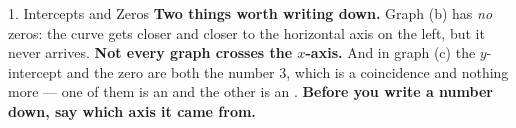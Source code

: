\documentclass[10pt]{article}
\begin{document}
\begin{notesbox}{1. Intercepts and Zeros}
\vspace{6pt}
\textbf{Two things worth writing down.} Graph (b) has \emph{no} zeros: the curve gets closer and
closer to the horizontal axis on the left, but it never arrives. \textbf{Not every graph crosses the
$x$-axis.} And in graph (c) the $y$-intercept and the zero are both the number $3$, which is a
coincidence and nothing more --- one of them is an \blank{1.9cm} and the other is an
\blank{1.9cm}. \textbf{Before you write a number down, say which axis it came from.}
\end{notesbox}

\vspace{0.10in}

\boxguard[30]
\end{document}
